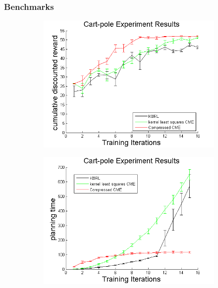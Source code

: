 \documentclass[letterpaper]{article}
\begin{document}
\subsubsection{Benchmarks}

\begin{figure}[htb]
\centering
\begin{subfigure}[b]{0.3\textwidth}
\includegraphics[width=\textwidth]{CPrewards.png}
\end{subfigure}
\begin{subfigure}[b]{0.3\textwidth}
\includegraphics[width=\textwidth]{CPplanning.png}
\end{subfigure}

\end{figure}
\end{document}
